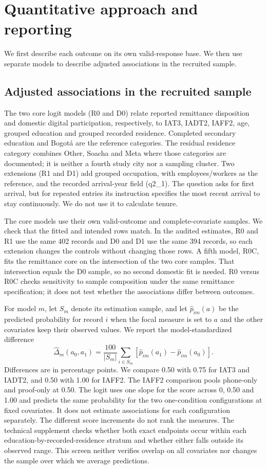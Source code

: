 \section{Quantitative approach and reporting}
We first describe each outcome on its own valid-response base. We then use separate models to describe adjusted associations in the recruited sample.
\subsection{Adjusted associations in the recruited sample}
The two core logit models (R0 and D0) relate reported remittance disposition and domestic digital participation, respectively, to IAT3, IADT2, IAFF2, age, grouped education and grouped recorded residence. Completed secondary education and Bogotá are the reference categories. The residual residence category combines Other, Soacha and Meta where those categories are documented; it is neither a fourth study city nor a sampling cluster. Two extensions (R1 and D1) add grouped occupation, with employees/workers as the reference, and the recorded arrival-year field (q2\_1). The question asks for first arrival, but for repeated entries its instruction specifies the most recent arrival to stay continuously. We do not use it to calculate tenure.

The core models use their own valid-outcome and complete-covariate samples. We check that the fitted and intended rows match. In the audited estimates, R0 and R1 use the same 402 records and D0 and D1 use the same 394 records, so each extension changes the controls without changing those rows. A fifth model, R0C, fits the remittance core on the intersection of the two core samples. That intersection equals the D0 sample, so no second domestic fit is needed. R0 versus R0C checks sensitivity to sample composition under the same remittance specification; it does not test whether the associations differ between outcomes.

For model $m$, let $S_m$ denote its estimation sample, and let $\widehat p_{im}(a)$ be the predicted probability for record $i$ when the focal measure is set to $a$ and the other covariates keep their observed values. We report the model-standardized difference
\[
  \widehat{\Delta}_m(a_0,a_1)=
  \frac{100}{|S_m|}\sum_{i\in S_m}
    [\widehat p_{im}(a_1)-\widehat p_{im}(a_0)] .
\]
Differences are in percentage points. We compare 0.50 with 0.75 for IAT3 and IADT2, and 0.50 with 1.00 for IAFF2. The IAFF2 comparison pools phone-only and proof-only at 0.50. The logit uses one slope for the score across 0, 0.50 and 1.00 and predicts the same probability for the two one-condition configurations at fixed covariates. It does not estimate associations for each configuration separately. The different score increments do not rank the measures. The technical supplement checks whether both exact endpoints occur within each education-by-recorded-residence stratum and whether either falls outside its observed range. This screen neither verifies overlap on all covariates nor changes the sample over which we average predictions.


